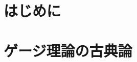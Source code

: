 \documentclass[unicode,a4paper,10pt]{ltjsarticle}
\begin{document}
\maketitle
\tableofcontents

\clearpage
\section{はじめに}



\clearpage
\section{ゲージ理論の古典論}














% 
% 


\end{document}
